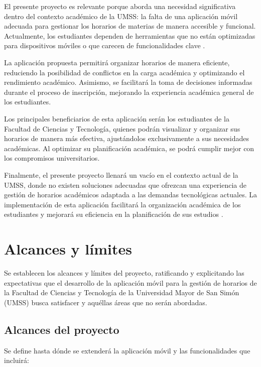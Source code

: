 El presente proyecto es relevante porque aborda una necesidad significativa dentro del contexto académico de la UMSS: la falta de una aplicación móvil adecuada para gestionar los horarios de materias de manera accesible y funcional. Actualmente, los estudiantes dependen de herramientas que no están optimizadas para dispositivos móviles o que carecen de funcionalidades clave \cite{smart_timetable}.

La aplicación propuesta permitirá organizar horarios de manera eficiente, reduciendo la posibilidad de conflictos en la carga académica y optimizando el rendimiento académico. Asimismo, se facilitará la toma de decisiones informadas durante el proceso de inscripción, mejorando la experiencia académica general de los estudiantes.

Los principales beneficiarios de esta aplicación serán los estudiantes de la Facultad de Ciencias y Tecnología, quienes podrán visualizar y organizar sus horarios de manera más efectiva, ajustándolos exclusivamente a sus necesidades académicas. Al optimizar su planificación académica, se podrá cumplir mejor con los compromisos universitarios.

Finalmente, el presente proyecto llenará un vacío en el contexto actual de la UMSS, donde no existen soluciones adecuadas que ofrezcan una experiencia de gestión de horarios académicos adaptada a las demandas tecnológicas actuales. La implementación de esta aplicación facilitará la organización académica de los estudiantes y mejorará su eficiencia en la planificación de sus estudios \cite{campushome_apps}.

\section{Alcances y límites}
\label{sec:AlcancesYLimites}

Se establecen los alcances y límites del proyecto, ratificando y explicitando las expectativas que el desarrollo de la aplicación móvil para la gestión de horarios de la Facultad de Ciencias y Tecnología de la Universidad Mayor de San Simón (UMSS) busca satisfacer y aquéllas áreas que no serán abordadas.

\subsection{Alcances del proyecto}

Se define hasta dónde se extenderá la aplicación móvil y las funcionalidades que incluirá:

